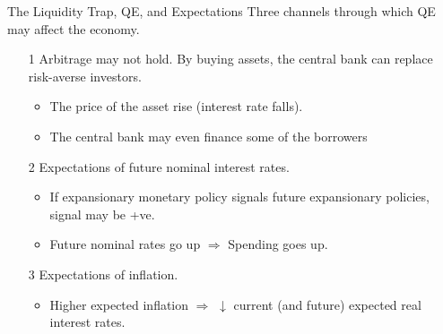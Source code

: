 \documentclass[shownotes,11pt, aspectratio=169]{beamer}
\begin{document}
\begin{frame}{The Liquidity Trap, QE, and Expectations}
Three channels through which QE may affect the economy.
\begin{itemize}
\item[1] Arbitrage may not hold. By buying assets, the central bank can replace risk-averse investors.
          \begin{itemize}
          \item The price of the asset rise (interest rate falls).
          \item The central bank may even finance some of the borrowers
          \end{itemize}
\pause
\item[2] Expectations of future nominal interest rates. 
         \begin{itemize}
         \item If expansionary monetary policy signals future expansionary policies, signal may be +ve.
         \item Future nominal rates go up $\Rightarrow$ Spending goes up.
         \end{itemize}
\pause
\item[3] Expectations of inflation.
         \begin{itemize}
         \item Higher expected inflation $\Rightarrow$ $\downarrow$ current (and future) expected real interest rates.
         \end{itemize}
\end{itemize}
\end{frame}
\end{document}
